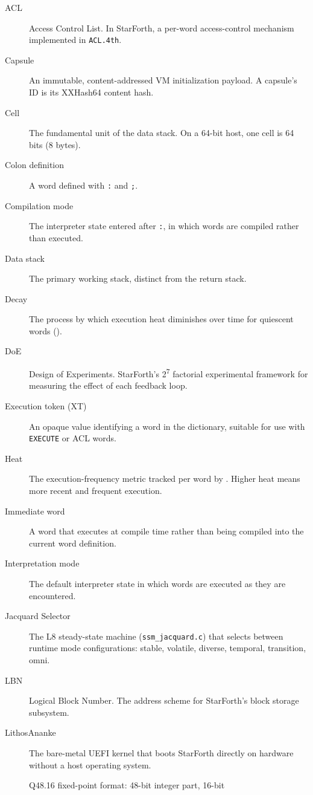 \begin{description}
  \item[ACL] Access Control List. In StarForth, a per-word access-control
    mechanism implemented in \texttt{ACL.4th}.
  \item[Capsule] An immutable, content-addressed VM initialization payload.
    A capsule's ID is its XXHash64 content hash.
  \item[Cell] The fundamental unit of the data stack. On a 64-bit host,
    one cell is 64 bits (8 bytes).
  \item[Colon definition] A word defined with \texttt{:} and \texttt{;}.
  \item[Compilation mode] The interpreter state entered after \texttt{:},
    in which words are compiled rather than executed.
  \item[Data stack] The primary working stack, distinct from the return stack.
  \item[Decay] The process by which execution heat diminishes over time for
    quiescent words ().
  \item[DoE] Design of Experiments. StarForth's 2\textsuperscript{7} factorial
    experimental framework for measuring the effect of each feedback loop.
  \item[Execution token (XT)] An opaque value identifying a word in the
    dictionary, suitable for use with \texttt{EXECUTE} or ACL words.
  \item[Heat] The execution-frequency metric tracked per word by
    . Higher heat means more recent and frequent execution.
  \item[Immediate word] A word that executes at compile time rather than
    being compiled into the current word definition.
  \item[Interpretation mode] The default interpreter state in which words
    are executed as they are encountered.
  \item[Jacquard Selector] The L8 steady-state machine (\texttt{ssm\_jacquard.c})
    that selects between runtime mode configurations: stable, volatile,
    diverse, temporal, transition, omni.
  \item[LBN] Logical Block Number. The address scheme for StarForth's
    block storage subsystem.
  \item[LithosAnanke] The bare-metal UEFI kernel that boots StarForth
    directly on hardware without a host operating system.
  \item[\Qtype{}] Q48.16 fixed-point format: 48-bit integer part, 16-bit

\end{description}
